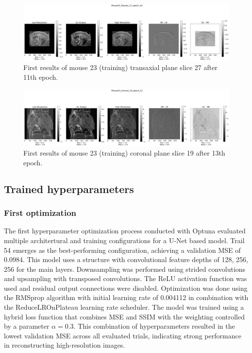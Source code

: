 \documentclass[twocolumn]{article}
\begin{document}
\begin{figure}
    \centering
    \includegraphics[width=1\linewidth]{Mouse23_Transax_27_epoch_10.png}
    \caption{First results of mouse 23 (training) transaxial plane slice 27 after 11th epoch.}
    \label{fig:first_transax}
\end{figure}

\begin{figure}
    \centering
    \includegraphics[width=1\linewidth]{Mouse23_Coronal_19_epoch_12.png}
    \caption{First results of mouse 23 (training) coronal plane slice 19 after 13th epoch.}
    \label{fig:first_coronal}
\end{figure}


\subsection{Trained hyperparameters}
\subsubsection{First optimization}
The first hyperparameter optimization process conducted with Optuna evaluated multiple architertural and training configurations for a U-Net based model. 
Trail 54 emerges as the best-performing configuration, achieving a validation MSE of 0.0984. 
This model uses a structure with convolutional feature depths of 128, 256, 256 for the main layers. 
Downsampling was performed using strided convolutions and upsampling with transposed convolutions. 
The ReLU activation function was used and residual output connections were disabled. 
Optimization was done using the RMSprop algorithm with initial learning rate of 0.004112 in combination with the ReduceLROnPlateau learning rate scheduler. 
The model was trained using a hybrid loss function that combines MSE and SSIM with the weighting controlled by a parameter $\alpha=0.3$.
This combination of hyperparameters resulted in the lowest validation MSE across all evaluated trials, indicating strong performance in reconstructing high-resolution images. 
\end{document}
